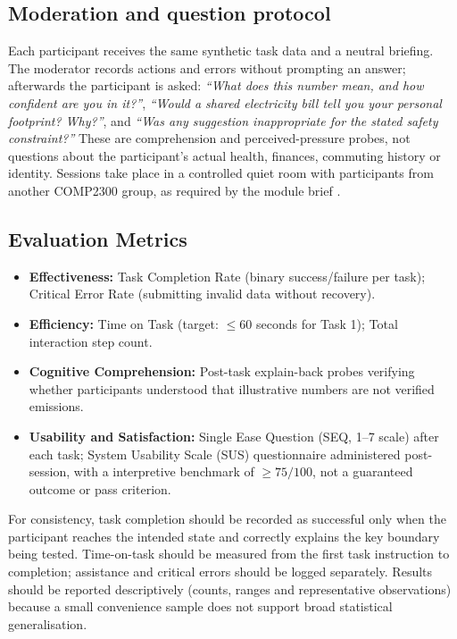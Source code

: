 \documentclass[12pt,a4paper]{article}
\begin{document}
\subsection{Moderation and question protocol}
Each participant receives the same synthetic task data and a neutral briefing. The moderator records actions and errors without prompting an answer; afterwards the participant is asked: \emph{``What does this number mean, and how confident are you in it?''}, \emph{``Would a shared electricity bill tell you your personal footprint? Why?''}, and \emph{``Was any suggestion inappropriate for the stated safety constraint?''} These are comprehension and perceived-pressure probes, not questions about the participant's actual health, finances, commuting history or identity. Sessions take place in a controlled quiet room with participants from another COMP2300 group, as required by the module brief \cite{modulebrief}.

\subsection{Evaluation Metrics}
\begin{itemize}[leftmargin=*]
  \item \textbf{Effectiveness:} Task Completion Rate (binary success/failure per task); Critical Error Rate (submitting invalid data without recovery).
  \item \textbf{Efficiency:} Time on Task (target: $\le 60$ seconds for Task 1); Total interaction step count.
  \item \textbf{Cognitive Comprehension:} Post-task explain-back probes verifying whether participants understood that illustrative numbers are not verified emissions.
  \item \textbf{Usability and Satisfaction:} Single Ease Question (SEQ, 1--7 scale) after each task; System Usability Scale (SUS) questionnaire administered post-session, with a interpretive benchmark of $\ge 75/100$, not a guaranteed outcome or pass criterion.
\end{itemize}

For consistency, task completion should be recorded as successful only when the participant reaches the intended state and correctly explains the key boundary being tested. Time-on-task should be measured from the first task instruction to completion; assistance and critical errors should be logged separately. Results should be reported descriptively (counts, ranges and representative observations) because a small convenience sample does not support broad statistical generalisation.
\end{document}
